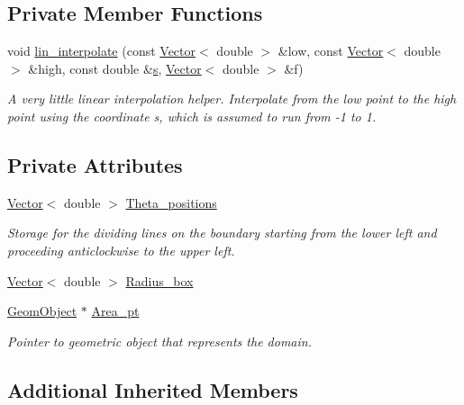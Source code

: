 \subsection*{Private Member Functions}
\begin{DoxyCompactItemize}
\item 
void \hyperlink{classoomph_1_1FullCircleDomain_a77b7b1454eb0082545b1b63310cb978a}{lin\+\_\+interpolate} (const \hyperlink{classoomph_1_1Vector}{Vector}$<$ double $>$ \&low, const \hyperlink{classoomph_1_1Vector}{Vector}$<$ double $>$ \&high, const double \&\hyperlink{cfortran_8h_ab7123126e4885ef647dd9c6e3807a21c}{s}, \hyperlink{classoomph_1_1Vector}{Vector}$<$ double $>$ \&f)
\begin{DoxyCompactList}\small\item\em A very little linear interpolation helper. Interpolate from the low point to the high point using the coordinate s, which is assumed to run from -\/1 to 1. \end{DoxyCompactList}\end{DoxyCompactItemize}
\subsection*{Private Attributes}
\begin{DoxyCompactItemize}
\item 
\hyperlink{classoomph_1_1Vector}{Vector}$<$ double $>$ \hyperlink{classoomph_1_1FullCircleDomain_ab995977e0da3045269da04fb15fd2cb6}{Theta\+\_\+positions}
\begin{DoxyCompactList}\small\item\em Storage for the dividing lines on the boundary starting from the lower left and proceeding anticlockwise to the upper left. \end{DoxyCompactList}\item 
\hyperlink{classoomph_1_1Vector}{Vector}$<$ double $>$ \hyperlink{classoomph_1_1FullCircleDomain_a96d5b35a7b41251a033d923afc953636}{Radius\+\_\+box}
\item 
\hyperlink{classoomph_1_1GeomObject}{Geom\+Object} $\ast$ \hyperlink{classoomph_1_1FullCircleDomain_a49eca6b304caf0840bd99bd18a9a32cd}{Area\+\_\+pt}
\begin{DoxyCompactList}\small\item\em Pointer to geometric object that represents the domain. \end{DoxyCompactList}\end{DoxyCompactItemize}
\subsection*{Additional Inherited Members}


